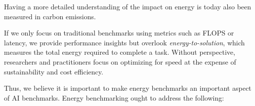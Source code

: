 Having a more detailed understanding of the impact on energy is today also been measured in carbon emissions. 

If we only focus on traditional benchmarks using metrics such as FLOPS or latency, we provide performance insights but overlook {\em energy-to-solution}, which measures the total energy required to complete a task. Without perspective, researchers and practitioners focus on optimizing for speed at the expense of sustainability and cost efficiency. 

Thus, we believe it is important to make energy benchmarks an important aspect of AI benchmarks. Energy benchmarking ought to address the following:


